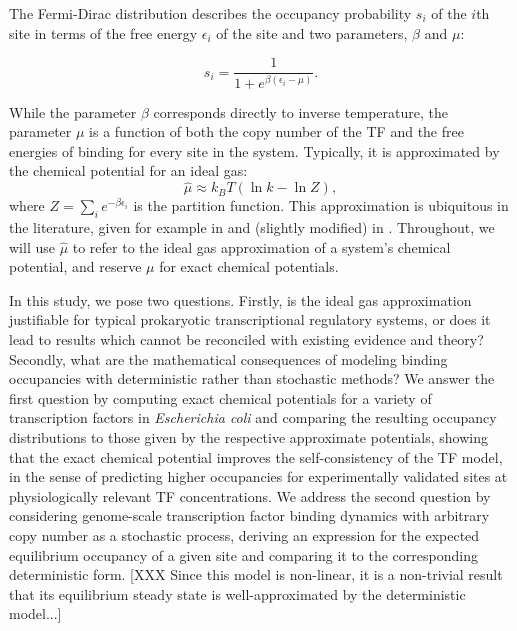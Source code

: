 \documentclass{article}
\begin{document}
The Fermi-Dirac distribution describes the occupancy probability $s_i$
of the $i$th site in terms of the free energy $\epsilon_i$ of the site
and two parameters, $\beta$ and $\mu$:

\begin{equation}
  \label{eq:s_fd}
  s_i = \frac{1}{1 + e^{\beta(\epsilon_i - \mu)}}.
\end{equation}

While the parameter $\beta$ corresponds directly to inverse
temperature, the parameter $\mu$ is a function of both the copy number
of the TF and the free energies of binding for every site in the
system.  Typically, it is approximated by the chemical potential for an ideal gas:
\begin{equation}
  \label{eq:mu_approx}
  \hat{\mu} \approx k_BT (\ln k - \ln Z),
\end{equation}
where $Z=\sum_ie^{-\beta\epsilon_i}$ is the partition function.  This
approximation is ubiquitous in the literature, given for example in
\cite{gerland02} and (slightly modified) in \cite{zhao09}.
Throughout, we will use $\hat\mu$ to refer to the ideal gas
approximation of a system's chemical potential, and reserve $\mu$ for
exact chemical potentials.

In this study, we pose two questions.  Firstly, is the ideal gas
approximation justifiable for typical prokaryotic transcriptional
regulatory systems, or does it lead to results which cannot be
reconciled with existing evidence and theory?  Secondly, what are the
mathematical consequences of modeling binding occupancies with
deterministic rather than stochastic methods?  We answer the first
question by computing exact chemical potentials for a variety of
transcription factors in \textit{Escherichia coli} and comparing the
resulting occupancy distributions to those given by the respective
approximate potentials, showing that the exact chemical potential
improves the self-consistency of the TF model, in the sense of
predicting higher occupancies for experimentally validated sites at
physiologically relevant TF concentrations.  We address the second
question by considering genome-scale transcription factor binding
dynamics with arbitrary copy number as a stochastic process, deriving
an expression for the expected equilibrium occupancy of a given site
and comparing it to the corresponding deterministic form.  [XXX Since
this model is non-linear, it is a non-trivial result that its
equilibrium steady state is well-approximated by the deterministic
model...]
\end{document}
